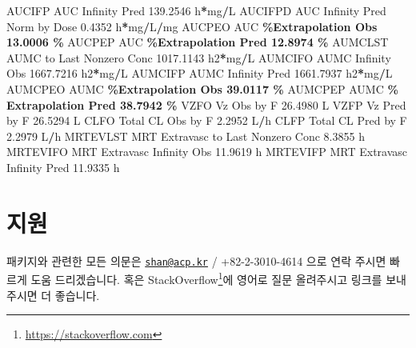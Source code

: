 \documentclass[
  12pt,
]{krantz}
\newenvironment{Shaded}{\begin{snugshade}}{\end{snugshade}}
\newcommand{\FloatTok}[1]{\textcolor[rgb]{0.00,0.00,0.81}{#1}}
\newcommand{\NormalTok}[1]{#1}
\newcommand{\OperatorTok}[1]{\textcolor[rgb]{0.81,0.36,0.00}{\textbf{#1}}}
\begin{document}
\begin{Shaded}
\begin{Highlighting}[]
\NormalTok{AUCIFP     AUC Infinity Pred                             }\FloatTok{139.2546}\NormalTok{ h}\OperatorTok{*}\NormalTok{mg}\OperatorTok{/}\NormalTok{L}
\NormalTok{AUCIFPD    AUC Infinity Pred Norm by Dose                  }\FloatTok{0.4352}\NormalTok{ h}\OperatorTok{*}\NormalTok{mg}\OperatorTok{/}\NormalTok{L}\OperatorTok{/}\NormalTok{mg}
\NormalTok{AUCPEO     AUC }\OperatorTok{\%Extrapolation Obs                         13.0006 \%}
\NormalTok{AUCPEP     AUC }\OperatorTok{\%Extrapolation Pred                        12.8974 \%}
\NormalTok{AUMCLST    AUMC to Last Nonzero Conc                    }\FloatTok{1017.1143}\NormalTok{ h2}\OperatorTok{*}\NormalTok{mg}\OperatorTok{/}\NormalTok{L}
\NormalTok{AUMCIFO    AUMC Infinity Obs                            }\FloatTok{1667.7216}\NormalTok{ h2}\OperatorTok{*}\NormalTok{mg}\OperatorTok{/}\NormalTok{L}
\NormalTok{AUMCIFP    AUMC Infinity Pred                           }\FloatTok{1661.7937}\NormalTok{ h2}\OperatorTok{*}\NormalTok{mg}\OperatorTok{/}\NormalTok{L}
\NormalTok{AUMCPEO    AUMC }\OperatorTok{\%Extrapolation Obs                        39.0117 \%}
\NormalTok{AUMCPEP    AUMC }\OperatorTok{\% Extrapolation Pred                      38.7942 \%}
\NormalTok{VZFO       Vz Obs by F                                    }\FloatTok{26.4980}\NormalTok{ L}
\NormalTok{VZFP       Vz Pred by F                                   }\FloatTok{26.5294}\NormalTok{ L}
\NormalTok{CLFO       Total CL Obs by F                               }\FloatTok{2.2952}\NormalTok{ L}\OperatorTok{/}\NormalTok{h}
\NormalTok{CLFP       Total CL Pred by F                              }\FloatTok{2.2979}\NormalTok{ L}\OperatorTok{/}\NormalTok{h}
\NormalTok{MRTEVLST   MRT Extravasc to Last Nonzero Conc              }\FloatTok{8.3855}\NormalTok{ h}
\NormalTok{MRTEVIFO   MRT Extravasc Infinity Obs                     }\FloatTok{11.9619}\NormalTok{ h}
\NormalTok{MRTEVIFP   MRT Extravasc Infinity Pred                    }\FloatTok{11.9335}\NormalTok{ h}
\end{Highlighting}
\end{Shaded}

\hypertarget{support}{%
\chapter{지원}\label{support}}

패키지와 관련한 모든 의문은 \href{mailto:shan@acp.kr}{\nolinkurl{shan@acp.kr}} / +82-2-3010-4614 으로 연락 주시면 빠르게 도움 드리겠습니다.
혹은 StackOverflow\footnote{\url{https://stackoverflow.com}}에 영어로 질문 올려주시고 링크를 보내주시면 더 좋습니다.
\end{document}

